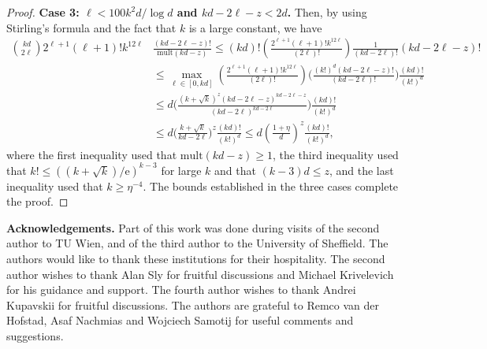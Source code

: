 \documentclass[reqno,final,a4paper]{amsart}
\theoremstyle{definition}
\newcommand{\mult}{\mathrm{mult}}
\def\e{\mathrm{e}}
\newcommand{\1}{\mathbbm{1}}
\begin{document}
\begin{proof}
\noindent
\textbf{Case 3:  $\ell < 100k^2d/\log d$ and $ kd-2\ell-z < 2d$.} Then, by using Stirling's formula and the fact that $k$ is a large constant, we have
\begin{align*}
\binom{kd}{2\ell} 2^{\ell+1} (\ell+1)! k^{12\ell}  
&\frac{(kd-2\ell-z)!}{\mult(kd-z)}
\leq  (kd)! \left(\frac{2^{\ell+1} (\ell+1)! k^{12\ell}}{(2\ell)!}\right) \frac{1}{(kd-2\ell)!} (kd-2\ell-z)!\\
&\leq  \max_{\ell\in [0,kd]} \left(\frac{2^{\ell+1} (\ell+1)! k^{12\ell}}{(2\ell)!}\right) \bigg(\frac{(k!)^d (kd-2\ell-z)!}{(kd-2\ell)!}\bigg) \frac{(kd)!}{(k!)^d}\\
&\leq d \bigg(\frac{(k+\sqrt{k})^z (kd-2\ell-z)^{kd-2\ell-z}}{(kd-2\ell)^{kd-2\ell}}\bigg) \frac{(kd)!}{(k!)^d}\\
&\leq d \bigg(\frac{k+\sqrt{k}}{kd-2\ell}\bigg)^z \frac{(kd)!}{(k!)^d} \leq d\left(\frac{1+\eta}{d}\right)^z \frac{(kd)!}{(k!)^d},
\end{align*} 
where the first inequality used that $\mult(kd-z)\ge 1$, the third inequality used that $k!\le ((k+\sqrt{k})/\e)^{k-3}$ for large $k$ and that $(k-3)d\le z$, and the last inequality used that $k\ge \eta^{-4}$.
The bounds established in the three cases complete the proof.
\end{proof}

\noindent
\textbf{Acknowledgements.} Part of this work was done during visits of the second author to TU Wien, and of the third author to the University of Sheffield. The authors would like to thank these institutions for their hospitality.
The second author wishes to thank Alan Sly for fruitful discussions and Michael Krivelevich for his guidance and support. The fourth author wishes to thank Andrei Kupavskii for fruitful discussions.
The authors are grateful to Remco van der Hofstad, Asaf Nachmias and Wojciech Samotij for useful comments and suggestions.




 
\end{document}
